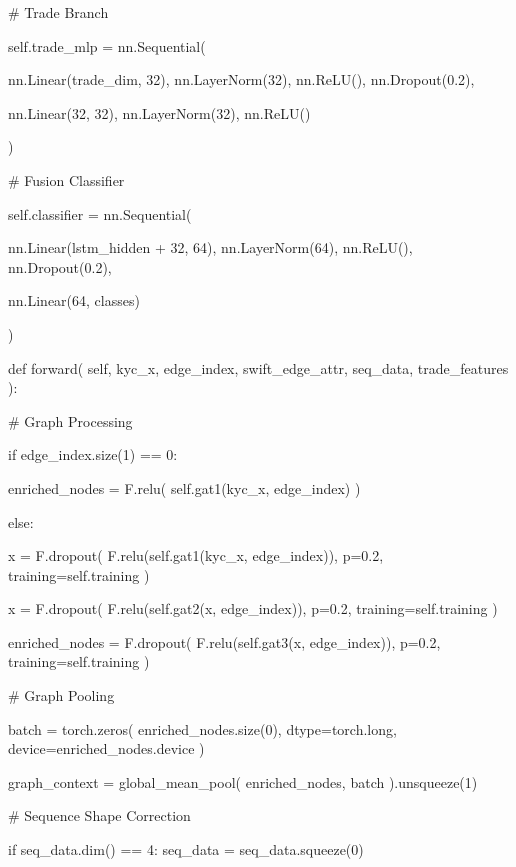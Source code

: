 \begin{tcblisting}
        # Trade Branch

        self.trade_mlp = nn.Sequential(

            nn.Linear(trade_dim, 32),
            nn.LayerNorm(32),
            nn.ReLU(),
            nn.Dropout(0.2),

            nn.Linear(32, 32),
            nn.LayerNorm(32),
            nn.ReLU()

        )

        # Fusion Classifier

        self.classifier = nn.Sequential(

            nn.Linear(lstm_hidden + 32, 64),
            nn.LayerNorm(64),
            nn.ReLU(),
            nn.Dropout(0.2),

            nn.Linear(64, classes)

        )

    def forward(
        self,
        kyc_x,
        edge_index,
        swift_edge_attr,
        seq_data,
        trade_features
    ):

        # Graph Processing

        if edge_index.size(1) == 0:

            enriched_nodes = F.relu(
                self.gat1(kyc_x, edge_index)
            )

        else:

            x = F.dropout(
                F.relu(self.gat1(kyc_x, edge_index)),
                p=0.2,
                training=self.training
            )

            x = F.dropout(
                F.relu(self.gat2(x, edge_index)),
                p=0.2,
                training=self.training
            )

            enriched_nodes = F.dropout(
                F.relu(self.gat3(x, edge_index)),
                p=0.2,
                training=self.training
            )

        # Graph Pooling

        batch = torch.zeros(
            enriched_nodes.size(0),
            dtype=torch.long,
            device=enriched_nodes.device
        )

        graph_context = global_mean_pool(
            enriched_nodes,
            batch
        ).unsqueeze(1)

        # Sequence Shape Correction

        if seq_data.dim() == 4:
            seq_data = seq_data.squeeze(0)


\end{tcblisting}
